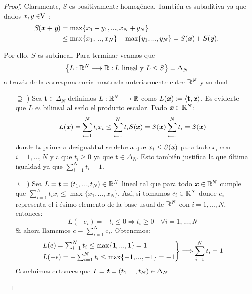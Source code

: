 	\begin{proof}
		Claramente, $ S $ es positivamente homogénea. También es subaditiva ya que dados $ x,y \in \vecSpace $ : 
		\begin{equation*}
		\begin{split}
		S(\textbf{\emph{x}}+\textbf{\emph{y}}) &= \max \{x_1 + y_1, ..., x_N +y_N \}\\ 
		&\leq \max\{x_1, ..., x_N\} + \max \{y_1, ...,y_N\} = S(\textbf{\emph{x}}) + S(\textbf{\emph{y}}).
		\end{split}
		\end{equation*}
		
		Por ello, $ S $ es sublineal. Para terminar veamos que  \[\left\lbrace L:\mathbb{R}^N \longrightarrow \mathbb{R} : L \text{ lineal y }L\leq S \right\rbrace  =  \Delta_N \]
		 a través de la correspondencia mostrada anteriormente entre $ \mathbb{R}^N $ y su dual.
		
		\begin{itemize}
			\item[$ \supseteq $ )] Sea $ \mathbf{t} \in \Delta_N$ definimos $ L:\mathbb{R}^N \longrightarrow \mathbb{R} $ como $ L(\textbf{\emph{x}}):= \langle \mathbf{t},\textbf{\emph{x}} \rangle $. Es evidente que $ L $ es bilineal al serlo el producto escalar. Dado $ \textbf{\emph{x}} \in \mathbb{R}^N $:
			\begin{equation*}
				L(\textbf{\emph{x}}) = \sum_{i=1}^{N}{t_i x_i} \leq \sum_{i=1}^{N}{t_i S(\textbf{\emph{x}})} = S(\textbf{\emph{x}})\sum_{i=1}^{N}{t_i} = S(\textbf{\emph{x}})
			\end{equation*}
			donde la primera desigualdad se debe a que $ x_i \leq S(\textbf{\emph{x}})$ para todo $ x_i$ con $ i=1,...,N $ y a que $ t_i \geq 0 $ ya que $ \mathbf{t} \in \Delta_N$. Esto también justifica la que última igualdad ya que $ \sum_{i=1}^{N}{t_i} = 1 $.
			
			\item[$ \subseteq $ )] Sea $ L = \textbf{\emph{t}} = (t_1,...,t_N) \in \mathbb{R}^N $ lineal tal que para todo $ \textbf{\emph{x}} \in \mathbb{R}^N $ cumple que $ \sum_{i=1}^{N}{t_i x_i} \leq \max\{x_1,...,x_N\}$. Así, si tomamos $ e_i \in \mathbb{R}^N $ donde $ e_i $ representa el i-ésimo elemento de la base usual de $ \mathbb{R}^N $ con $ i=1,...,N $, entonces:   		
			\begin{equation*}
				L(-e_i) = -t_i \leq 0 \Longrightarrow t_i \geq 0 \quad \forall i=1,...,N
			\end{equation*}
			Si ahora llamamos $ e = \sum_{i=1}^{N}{e_i} $. Obtenemos:
			\begin{equation*}
				\begin{rcases*}
				L(e) = \sum_{i=1}^{N}{t_i} \leq \max \{1, ...,1\} = 1 \\
				L(-e) = -\sum_{i=1}^{N}{t_i} \leq \max \{-1, ...,-1\} = -1
				\end{rcases*} \Longrightarrow \sum_{i=1}^{N}{t_i} = 1
			\end{equation*}
			Concluimos entonces que $ L = \textbf{\emph{t}} = (t_1,...,t_N) \in \Delta_N $.
		\end{itemize}
		
	\end{proof}

